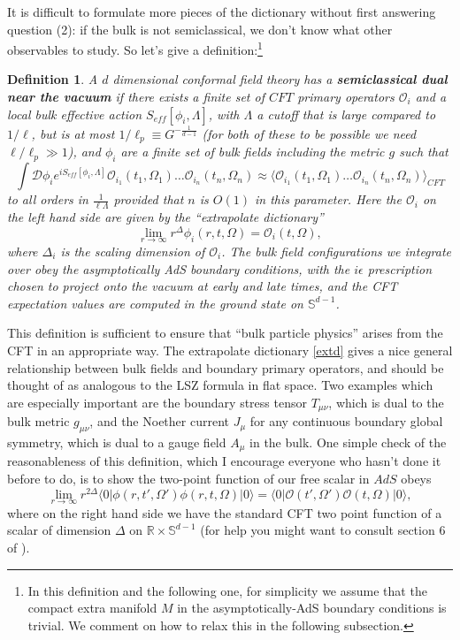 \documentclass[toc]{PoS}
\newcommand{\be}{\begin{equation}}
\newcommand{\ee}{\end{equation}}
\newcommand{\lan}{\langle}
\newcommand{\ran}{\rangle}
\newcommand{\mO}{\mathcal{O}}
\newtheorem{mydef}{Definition}[section]
\begin{document}
It is difficult to formulate more pieces of the dictionary without first answering question (2): if the bulk is not semiclassical, we don't know what other observables to study.  So let's give a definition:\footnote{In this definition and the following one, for simplicity we assume that the compact extra manifold $M$ in the asymptotically-AdS boundary conditions is trivial.  We comment on how to relax this in the following subsection.}
\begin{mydef}\label{scvac}
A $d$ dimensional conformal field theory has a \textbf{semiclassical dual near the vacuum} if there exists a finite set of $CFT$ primary operators $\mO_i$ and a local bulk effective action $S_{eff}[\phi_i,\Lambda]$, with $\Lambda$ a cutoff that is large compared to $1/\ell$, but is at most $1/\ell_p\equiv G^{-\frac{1}{d-1}}$ (for both of these to be possible we need $\ell/\ell_p\gg 1$),  and $\phi_i$ are a finite set of bulk fields including the metric $g$ such that
\be\label{dictcorr}
\int \mathcal{D}\phi_i e^{iS_{eff}[\phi_i,\Lambda]}\mO_{i_1}(t_1,\Omega_1)\ldots \mO_{i_n}(t_n,\Omega_n)\approx \lan \mO_{i_1}(t_1,\Omega_1)\ldots \mO_{i_n}(t_n,\Omega_n)\ran_{CFT}
\ee 
to all orders in $\frac{1}{\ell\Lambda}$ provided that $n$ is $O(1)$ in this parameter.  Here the $\mO_i$ on the left hand side are given by the ``extrapolate dictionary''
\be\label{extd}
\lim_{r\to\infty}r^{\Delta}\phi_i(r,t,\Omega)=\mO_i(t,\Omega),
\ee
where $\Delta_i$ is the scaling dimension of $\mO_i$.  The bulk field configurations we integrate over obey the asymptotically AdS boundary conditions, with the $i\epsilon$ prescription chosen to project onto the vacuum at early and late times, and the CFT expectation values are computed in the ground state on $\mathbb{S}^{d-1}$.
\end{mydef}
This definition is sufficient to ensure that ``bulk particle physics'' arises from the CFT in an appropriate way.  The extrapolate dictionary \eqref{extd} gives a nice general relationship between bulk fields and boundary primary operators, and should be thought of as analogous to the LSZ formula in flat space. Two examples which are especially important are the boundary stress tensor $T_{\mu\nu}$, which is dual to the bulk metric $g_{\mu\nu}$, and the Noether current $J_\mu$ for any continuous boundary global symmetry, which is dual to a gauge field $A_\mu$ in the bulk.  One simple check of the reasonableness of this definition, which I encourage everyone who hasn't done it before to do, is to show the two-point function of our free scalar in $AdS$ obeys
\be
\lim_{r\to\infty}r^{2\Delta}\lan 0|\phi(r,t',\Omega')\phi(r,t,\Omega)|0\ran=\lan 0|\mO(t',\Omega')\mO(t,\Omega)|0\ran,
\ee 
where on the right hand side we have the standard CFT two point function of a scalar of dimension $\Delta$ on $\mathbb{R}\times \mathbb{S}^{d-1}$ (for help you might want to consult section 6 of \cite{Harlow:2014yka}).  
\end{document}
